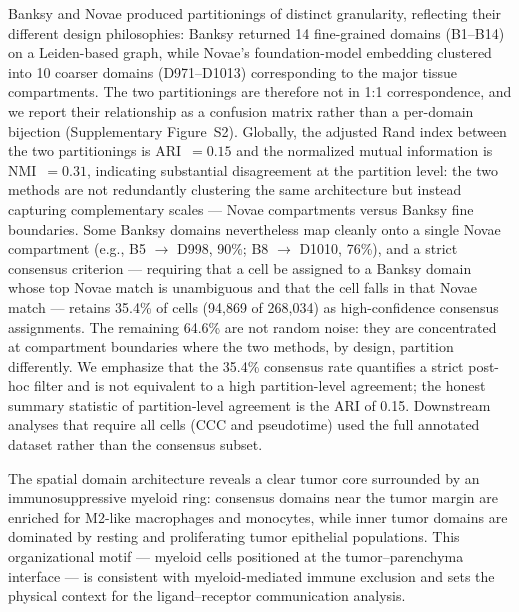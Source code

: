 \documentclass[12pt,a4paper]{article}
\begin{document}
Banksy and Novae produced partitionings of distinct granularity, reflecting their different design philosophies: Banksy returned 14 fine-grained domains (B1--B14) on a Leiden-based graph, while Novae's foundation-model embedding clustered into 10 coarser domains (D971--D1013) corresponding to the major tissue compartments. The two partitionings are therefore not in 1:1 correspondence, and we report their relationship as a confusion matrix rather than a per-domain bijection (Supplementary Figure~S2). Globally, the adjusted Rand index between the two partitionings is ARI~$=0.15$ and the normalized mutual information is NMI~$=0.31$, indicating substantial disagreement at the partition level: the two methods are not redundantly clustering the same architecture but instead capturing complementary scales --- Novae compartments versus Banksy fine boundaries. Some Banksy domains nevertheless map cleanly onto a single Novae compartment (e.g., B5 $\to$ D998, 90\%; B8 $\to$ D1010, 76\%), and a strict consensus criterion --- requiring that a cell be assigned to a Banksy domain whose top Novae match is unambiguous and that the cell falls in that Novae match --- retains 35.4\% of cells (94,869 of 268,034) as high-confidence consensus assignments. The remaining 64.6\% are not random noise: they are concentrated at compartment boundaries where the two methods, by design, partition differently. We emphasize that the 35.4\% consensus rate quantifies a strict post-hoc filter and is not equivalent to a high partition-level agreement; the honest summary statistic of partition-level agreement is the ARI of 0.15. Downstream analyses that require all cells (CCC and pseudotime) used the full annotated dataset rather than the consensus subset.

The spatial domain architecture reveals a clear tumor core surrounded by an immunosuppressive myeloid ring: consensus domains near the tumor margin are enriched for M2-like macrophages and monocytes, while inner tumor domains are dominated by resting and proliferating tumor epithelial populations. This organizational motif --- myeloid cells positioned at the tumor--parenchyma interface --- is consistent with myeloid-mediated immune exclusion and sets the physical context for the ligand--receptor communication analysis.
\end{document}
